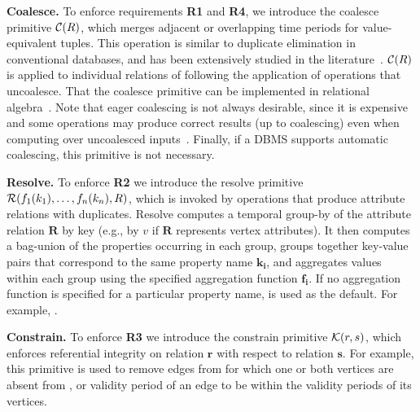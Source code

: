 {\bf Coalesce.} To enforce requirements {\bf R1} and {\bf R4}, we
introduce the coalesce primitive $\mathcal{C}(R)$, which merges adjacent or
overlapping time periods for value-equivalent tuples.  This operation
is similar to duplicate elimination in conventional databases, and has
been extensively studied in the
literature~\cite{DBLP:conf/vldb/BohlenSS96,DBLP:journals/sigmod/Zimanyi06}.
$\mathcal{C}(R)$ is applied to individual relations of \tve following the
application of operations that uncoalesce.  That the coalesce
primitive can be implemented in relational
algebra~\cite{DBLP:conf/vldb/BohlenSS96}.  Note that eager coalescing
is not always desirable, since it is expensive and some operations may
produce correct results (up to coalescing) even when computing over
uncoalesced inputs~\cite{DBLP:reference/db/Bohlen09}.  Finally, if a
DBMS supports automatic coalescing, this primitive is not necessary.

{\bf Resolve.} To enforce {\bf R2} we introduce the resolve primitive
$\mathcal{R}(f_1(k_1), \ldots, f_n(k_n),R)$, which is invoked by
operations that produce attribute relations with duplicates.  Resolve
computes a temporal group-by of the attribute relation $\mathbf{R}$ by
key (e.g., by $v$ if $\mathbf{R}$ represents vertex attributes).  It
then computes a bag-union of the properties occurring in each group,
groups together key-value pairs that correspond to the same property
name $\mathbf{k_i}$, and aggregates values within each group using
the specified aggregation function $\mathbf{f_i}$.  If no aggregation
function is specified for a particular property name,  is
used as the default.  For example, .

{\bf Constrain.} To enforce {\bf R3} we introduce the constrain
primitive $\mathcal{K}(r,s)$, which enforces referential integrity on
relation $\mathbf{r}$ with respect to relation $\mathbf{s}$.  For
example, this primitive is used to remove edges from \te for which one
or both vertices are absent from \tv, or validity period of an edge to
be within the validity periods of its vertices.


